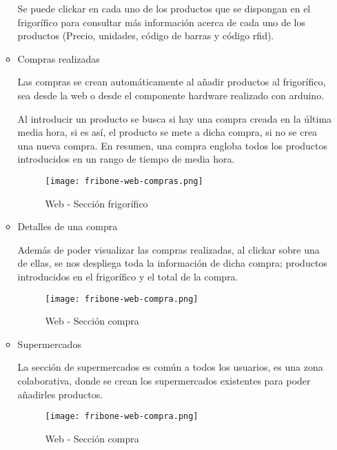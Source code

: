 \begin{itemize}
\begin{itemize}
                Se puede clickar en cada uno de los productos que se dispongan en el frigorífico para consultar más información acerca de cada uno de los productos (Precio, unidades, código de barras y código rfid).

                \item Compras realizadas

                Las compras se crean automáticamente al añadir productos al frigorífico, sea desde la web o desde el componente hardware realizado con arduino.

                Al introducir un producto se busca si hay una compra creada en la última media hora, si es así, el producto se mete a dicha compra, si no se crea una nueva compra. En resumen, una compra engloba todos los productos introducidos en un rango de tiempo de media hora.

                \begin{figure}[H]
                    \centering
                    \texttt{[image: fribone-web-compras.png]}
                    \caption{Web - Sección frigorífico}\label{fig:fribone-web-comras}
                \end{figure}

                \item Detalles de una compra

                Además de poder visualizar las compras realizadas, al clickar sobre una de ellas, se nos despliega toda la información de dicha compra; productos introducidos en el frigorífico y el total de la compra.

                \begin{figure}[H]
                    \centering
                    \texttt{[image: fribone-web-compra.png]}
                    \caption{Web - Sección compra}\label{fig:fribone-web-compra}
                \end{figure}

                \item Supermercados

                    La sección de supermercados es común a todos los usuarios, es una zona colaborativa, donde se crean los supermercados existentes para poder añadirles productos.

                    \begin{figure}[H]
                        \centering
                        \texttt{[image: fribone-web-compra.png]}
                        \caption{Web - Sección compra}\label{fig:fribone-web-compra}
                    \end{figure}


\end{itemize}
\end{itemize}
